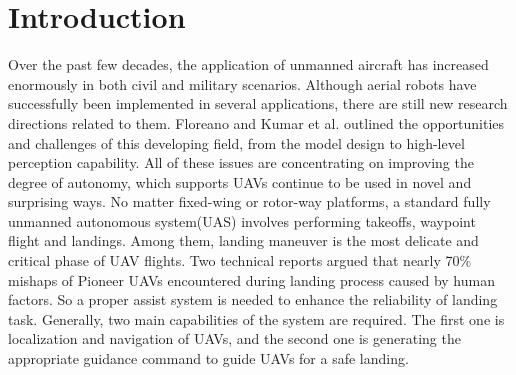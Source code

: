\documentclass[journal,article,submit,moreauthors,pdftex,10pt,a4paper]{mdpi}
\begin{document}


\section{Introduction}
Over the past few decades, the application of unmanned aircraft has increased enormously in both civil and military scenarios. Although aerial robots have successfully been implemented in several applications, there are still new research directions related to them. Floreano \cite{floreano2015science} and Kumar et al. \cite{kushleyev2013towards} outlined the opportunities and challenges of this developing field, from the model design to high-level perception capability. All of these issues are concentrating on improving the degree of autonomy, which supports UAVs continue to be used in novel and surprising ways.
No matter fixed-wing or rotor-way platforms, a standard fully unmanned autonomous system(UAS) involves performing takeoffs, waypoint flight and landings. Among them, landing maneuver is the most delicate and critical phase of UAV flights. Two technical reports \cite{manning2004role} argued that nearly 70\% mishaps of Pioneer UAVs encountered during landing process caused by human factors. So a proper assist system is needed to enhance the reliability of landing task. Generally, two main capabilities of the system are required. The first one is localization and navigation of UAVs, and the second one is generating the appropriate guidance command to guide UAVs for a safe landing. 
\end{document}
